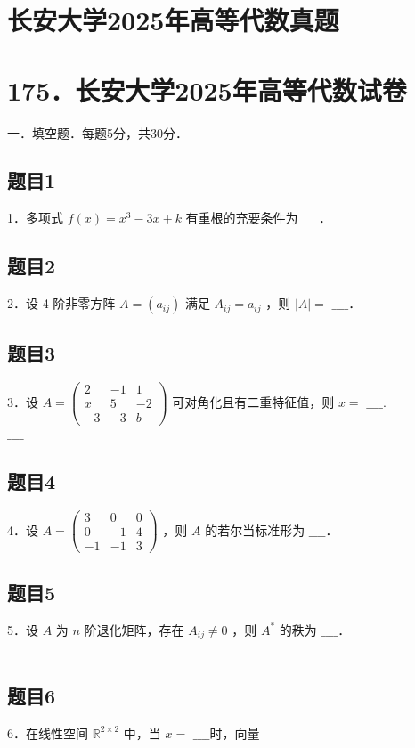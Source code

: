 \documentclass{article}
\begin{document}
\section*{长安大学2025年高等代数真题}
\section*{175．长安大学2025年高等代数试卷}
一．填空题．每题5分，共30分．\\

\subsection{题目1}
1．多项式 \(f(x)=x^{3}-3 x+k\) 有重根的充要条件为 \(\_\_\_\_\)．

\subsection{题目2}
2．设 4 阶非零方阵 \(A=\left(a_{i j}\right)\) 满足 \(A_{i j}=a_{i j}\) ，则 \(|A|=\) \(\_\_\_\_\)．

\subsection{题目3}
3．设 \(A=\left(\begin{array}{ccc}2 & -1 & 1 \\ x & 5 & -2 \\ -3 & -3 & b\end{array}\right)\) 可对角化且有二重特征值，则 \(x=\) \(\_\_\_\_\).\\
\(\_\_\_\_\)

\subsection{题目4}
4．设 \(A=\left(\begin{array}{rrr}3 & 0 & 0 \\ 0 & -1 & 4 \\ -1 & -1 & 3\end{array}\right)\) ，则 \(A\) 的若尔当标准形为 \(\_\_\_\_\)．

\subsection{题目5}
5．设 \(A\) 为 \(n\) 阶退化矩阵，存在 \(A_{i j} \neq 0\) ，则 \(A^{*}\) 的秩为 \(\_\_\_\_\)．\\
\(\_\_\_\_\)

\subsection{题目6}
6．在线性空间 \(\mathbb{R}^{2 \times 2}\) 中，当 \(x=\) \(\_\_\_\_\)时，向量
\end{document}

